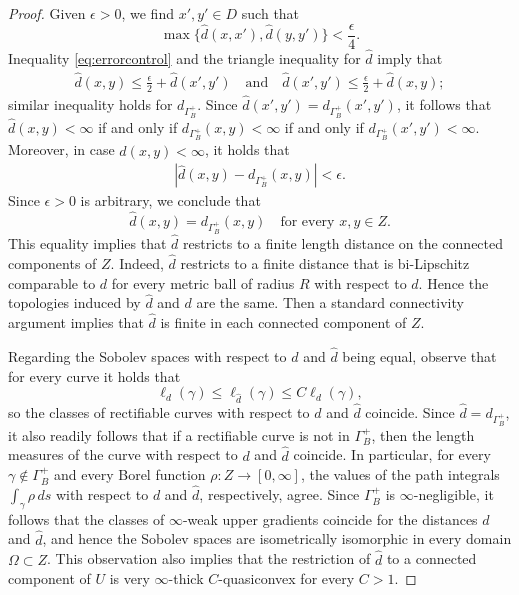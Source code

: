 \documentclass[reqno]{amsart}
\numberwithin{equation}{section}
\theoremstyle{remark}
\begin{document}
\begin{proof}
Given $\epsilon > 0$, we find $x', y' \in D$ such that
\begin{equation}\label{eq:errorcontrol}
    \max\{ \widehat{d}(x,x'), \widehat{d}( y, y' ) \} < \frac{ \epsilon }{ 4 }.
\end{equation}
Inequality \eqref{eq:errorcontrol} and the triangle inequality for $\widehat{d}$ imply that
\begin{align*}
    \widehat{d}(x,y) \leq \frac{ \epsilon }{ 2 } + \widehat{d}(x',y')
    \quad\text{and}\quad
    \widehat{d}(x',y') \leq \frac{ \epsilon }{ 2 } + \widehat{d}(x,y);
\end{align*}
similar inequality holds for $d_{ \Gamma^{+}_{B} }$. Since $\widehat{d}(x',y') = d_{ \Gamma^{+}_{B} }(x',y')$, it follows that $\widehat{d}(x,y) < \infty$ if and only if $d_{ \Gamma^{+}_{B} }(x, y) < \infty$ if and only if $d_{ \Gamma^{+}_{B} }(x',y') < \infty$. Moreover, in case $\widehat{d}(x,y) < \infty$, it holds that
\begin{align*}
    | \widehat{d}(x,y) - d_{\Gamma^{+}_{B}}(x,y) | < \epsilon.
\end{align*}
Since $\epsilon > 0$ is arbitrary, we conclude that
$$\widehat{d}(x,y) = d_{\Gamma^{+}_{B}}(x,y)\quad\text{for every $x, y \in Z$}.$$
This equality implies that $\widehat{d}$ restricts to a finite length distance on the connected components of $Z$. Indeed, $\widehat{d}$ restricts to a finite distance that is bi-Lipschitz comparable to $d$ for every metric ball of radius $R$ with respect to $d$. Hence the topologies induced by $\widehat{d}$ and $d$ are the same. Then a standard connectivity argument implies that $\widehat{d}$ is finite in each connected component of $Z$.

Regarding the Sobolev spaces with respect to $d$ and $\widehat{d}$ being equal, observe that for every curve it holds that 
$$\ell_{d}( \gamma ) \leq \ell_{ \widehat{d} }( \gamma ) \leq C \ell_{ d }( \gamma ),$$ 
so the classes of rectifiable curves with respect to $d$ and $\widehat{d}$ coincide. Since $\widehat{d} = d_{ \Gamma^{+}_{B} }$, it also readily follows that if a rectifiable curve is not in $\Gamma^{+}_{B}$, then the length measures of the curve with respect to $d$ and $\widehat{d}$ coincide. In particular, for every $\gamma\notin \Gamma^{+}_{B}$ and every Borel function $\rho \colon Z \to [0,\infty]$, the values of the path integrals $\int_{\gamma}\rho\, ds$ with respect to $d$ and $\widehat{d}$, respectively, agree. Since $\Gamma^{+}_{B}$ is $\infty$-negligible, it follows that the classes of $\infty$-weak upper gradients coincide for the distances $d$ and $\widehat d$, and hence the Sobolev spaces are isometrically isomorphic in every domain $\Omega \subset Z$. This observation also implies that the restriction of $\widehat{d}$ to a connected component of $U$ is very $\infty$-thick $C$-quasiconvex for every $C > 1$.


\end{proof}
\end{document}
